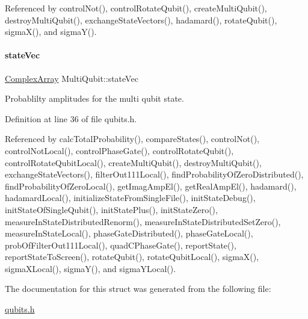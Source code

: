 Referenced by control\+Not(), control\+Rotate\+Qubit(), create\+Multi\+Qubit(), destroy\+Multi\+Qubit(), exchange\+State\+Vectors(), hadamard(), rotate\+Qubit(), sigma\+X(), and sigma\+Y().

\mbox{\label{structMultiQubit_a45483190d6b01ef6b2f98f2bec9ab94f}} 
\paragraph{\texorpdfstring{state\+Vec}{stateVec}}
{\footnotesize\ttfamily \hyperlink{structComplexArray}{Complex\+Array} Multi\+Qubit\+::state\+Vec}



Probablilty amplitudes for the multi qubit state. 



Definition at line 36 of file qubits.\+h.



Referenced by calc\+Total\+Probability(), compare\+States(), control\+Not(), control\+Not\+Local(), control\+Phase\+Gate(), control\+Rotate\+Qubit(), control\+Rotate\+Qubit\+Local(), create\+Multi\+Qubit(), destroy\+Multi\+Qubit(), exchange\+State\+Vectors(), filter\+Out111\+Local(), find\+Probability\+Of\+Zero\+Distributed(), find\+Probability\+Of\+Zero\+Local(), get\+Imag\+Amp\+El(), get\+Real\+Amp\+El(), hadamard(), hadamard\+Local(), initialize\+State\+From\+Single\+File(), init\+State\+Debug(), init\+State\+Of\+Single\+Qubit(), init\+State\+Plus(), init\+State\+Zero(), measure\+In\+State\+Distributed\+Renorm(), measure\+In\+State\+Distributed\+Set\+Zero(), measure\+In\+State\+Local(), phase\+Gate\+Distributed(), phase\+Gate\+Local(), prob\+Of\+Filter\+Out111\+Local(), quad\+C\+Phase\+Gate(), report\+State(), report\+State\+To\+Screen(), rotate\+Qubit(), rotate\+Qubit\+Local(), sigma\+X(), sigma\+X\+Local(), sigma\+Y(), and sigma\+Y\+Local().



The documentation for this struct was generated from the following file\+:\begin{DoxyCompactItemize}
\item 
\hyperlink{qubits_8h}{qubits.\+h}\end{DoxyCompactItemize}
